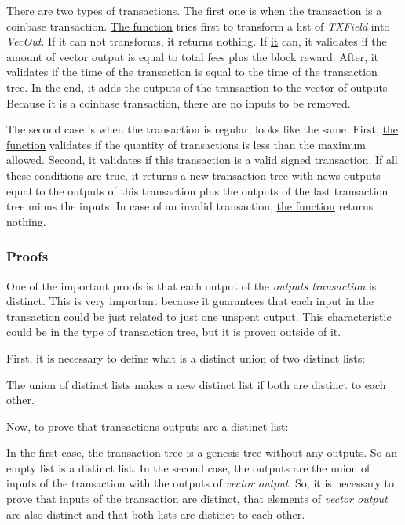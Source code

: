 
There are two types of transactions.
The first one is when the transaction is a coinbase transaction.
\hyperref[addtxtree1]{The function} tries first to transform a list of \emph{TXField} into \emph{VecOut}.
If it can not transforms, it returns nothing.
If \hyperref[addtxtree1]{it} can, it validates if the amount of vector output is
equal to total fees plus the block reward.
After, it validates if the time of the transaction is equal to the time of the transaction tree.
In the end, it adds the outputs of the transaction to the vector of outputs.
Because it is a coinbase transaction, there are no inputs to be removed.


The second case is when the transaction is regular, looks like the same.
First, \hyperref[addtxtree2]{the function} validates if the quantity of transactions is less
than the maximum allowed.
Second, it validates if this transaction is a valid signed transaction.
If all these conditions are true, it returns a new transaction tree
with news outputs equal to the outputs of this transaction plus the outputs of the last transaction tree
minus the inputs.
In case of an invalid transaction, \hyperref[addtxtree2]{the function} returns nothing.

\subsubsection{Proofs}

One of the important proofs is that each output of the \emph{outputs transaction} is distinct.
This is very important because it guarantees that each input in the transaction could be
just related to just one unspent output.
This characteristic could be in the type of transaction tree,
but it is proven outside of it.

First, it is necessary to define what is a distinct union of two distinct lists:


The union of distinct lists makes a new distinct list if both are distinct to each other.

Now, to prove that transactions outputs are a distinct list:


In the first case, the transaction tree is a genesis tree without any outputs.
So an empty list is a distinct list.
In the second case, the outputs are the union of inputs of the transaction with the outputs
of \emph{vector output}.
So, it is necessary to prove that inputs of the transaction are distinct,
that elements of \emph{vector output} are also distinct and that both lists are distinct to each other.

